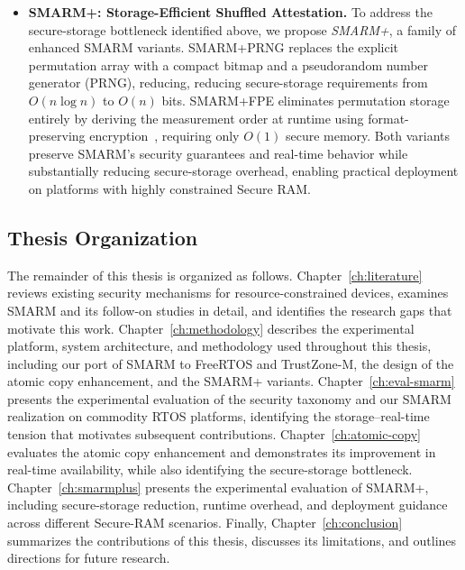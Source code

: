 \documentclass[a4paper,10pt]{article}
\begin{document}
\begin{itemize}
    \item \textbf{SMARM+: Storage-Efficient Shuffled Attestation.}
    To address the secure-storage bottleneck identified above, we
    propose \emph{SMARM+}, a family of enhanced SMARM variants.
    SMARM+PRNG replaces the explicit permutation 
    array with a compact bitmap and a pseudorandom number generator 
    (PRNG), reducing, reducing secure-storage requirements
    from $O(n \log n)$ to $O(n)$ bits. SMARM+FPE
    eliminates permutation storage entirely by deriving the
    measurement order at runtime using format-preserving
    encryption~\cite{bellare2009fpe,dworkin2016sp800}, requiring only
    $O(1)$ secure memory. Both variants preserve SMARM's security
    guarantees and real-time behavior while substantially reducing
    secure-storage overhead, enabling practical deployment on
    platforms with highly constrained Secure RAM.
\end{itemize}


\subsection{Thesis Organization}

The remainder of this thesis is organized as follows.
Chapter~\ref{ch:literature} reviews existing security mechanisms for
resource-constrained devices, examines SMARM and its follow-on studies
in detail, and identifies the research gaps that motivate this work.
Chapter~\ref{ch:methodology} describes the experimental platform,
system architecture, and methodology used throughout this thesis,
including our port of SMARM to FreeRTOS and TrustZone-M, the design
of the atomic copy enhancement, and the SMARM+ variants.
Chapter~\ref{ch:eval-smarm} presents the experimental evaluation of
the security taxonomy and our SMARM realization on commodity RTOS
platforms, identifying the storage--real-time tension that motivates
subsequent contributions. Chapter~\ref{ch:atomic-copy} evaluates the
atomic copy enhancement and demonstrates its improvement in real-time
availability, while also identifying the secure-storage bottleneck.
Chapter~\ref{ch:smarmplus} presents the experimental evaluation of
SMARM+, including secure-storage reduction, runtime overhead, and
deployment guidance across different Secure-RAM scenarios. Finally,
Chapter~\ref{ch:conclusion} summarizes the contributions of this
thesis, discusses its limitations, and outlines directions for
future research.
\end{document}
